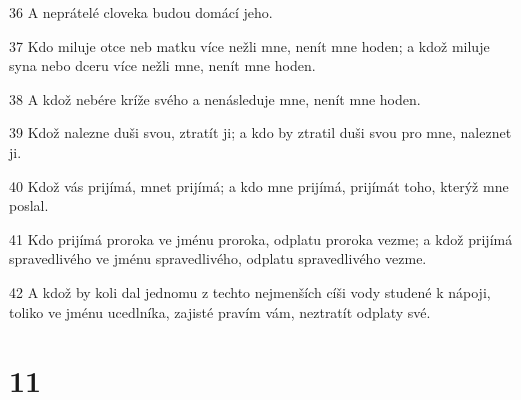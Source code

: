 \par 36 A neprátelé cloveka budou domácí jeho.
\par 37 Kdo miluje otce neb matku více nežli mne, nenít mne hoden; a kdož miluje syna nebo dceru více nežli mne, nenít mne hoden.
\par 38 A kdož nebére kríže svého a nenásleduje mne, nenít mne hoden.
\par 39 Kdož nalezne duši svou, ztratít ji; a kdo by ztratil duši svou pro mne, naleznet ji.
\par 40 Kdož vás prijímá, mnet prijímá; a kdo mne prijímá, prijímát toho, kterýž mne poslal.
\par 41 Kdo prijímá proroka ve jménu proroka, odplatu proroka vezme; a kdož prijímá spravedlivého ve jménu spravedlivého, odplatu spravedlivého vezme.
\par 42 A kdož by koli dal jednomu z techto nejmenších cíši vody studené k nápoji, toliko ve jménu ucedlníka, zajisté pravím vám, neztratít odplaty své.

\chapter{11}

